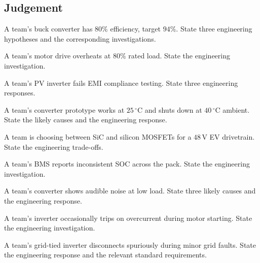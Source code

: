 \subsection*{Judgement}

\begin{exercise}
A team's buck converter has $80\%$ efficiency, target $94\%$. State three engineering hypotheses and the corresponding investigations.
\end{exercise}

\begin{exercise}
A team's motor drive overheats at $80\%$ rated load. State the engineering investigation.
\end{exercise}

\begin{exercise}
A team's PV inverter fails EMI compliance testing. State three engineering responses.
\end{exercise}

\begin{exercise}
A team's converter prototype works at $25\,^\circ\text{C}$ and shuts down at $40\,^\circ\text{C}$ ambient. State the likely causes and the engineering response.
\end{exercise}

\begin{exercise}
A team is choosing between SiC and silicon MOSFETs for a $48\,\text{V}$ EV drivetrain. State the engineering trade-offs.
\end{exercise}

\begin{exercise}
A team's BMS reports inconsistent SOC across the pack. State the engineering investigation.
\end{exercise}

\begin{exercise}
A team's converter shows audible noise at low load. State three likely causes and the engineering response.
\end{exercise}

\begin{exercise}
A team's inverter occasionally trips on overcurrent during motor starting. State the engineering investigation.
\end{exercise}

\begin{exercise}
A team's grid-tied inverter disconnects spuriously during minor grid faults. State the engineering response and the relevant standard requirements.
\end{exercise}
